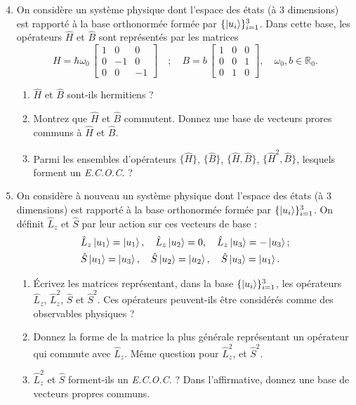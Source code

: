 \begin{enumerate}
\setcounter{enumi}{3}
\item On considère un système physique dont l'espace des états (à 3 dimensions) est rapporté à la base orthonormée formée par $\lbrace \ket{u_i} \rbrace_{i=1}^3$. Dans cette base, les opérateurs $\hat H$ et $\hat B$ sont représentés par les matrices
\begin{equation}
H =\hbar \omega_0 \,  \left[ 
\begin{array}{ccc}
1 & 0 & 0 \\ 
0 & -1 & 0 \\ 
0 & 0 & -1
\end{array} 
\right]
\quad ; \quad
B = b \, \left[
\begin{array}{ccc}
1 & 0 & 0 \\ 
0 & 0 & 1 \\ 
0 & 1 & 0
\end{array} 
\right], \quad \omega_0,b \in \mathbb{R}_0.
\end{equation}
	\begin{enumerate}
	\item $\hat H$ et $\hat B$ sont-ils hermitiens ?
	\item Montrez que $\hat H$ et $\hat B$ commutent. Donnez une base de vecteurs prores communs à $\hat H$ et $\hat B$. 
	\item Parmi les ensembles d'opérateurs $\lbrace \hat H \rbrace$, $\lbrace \hat B \rbrace$, $\lbrace \hat H,\hat B \rbrace$, $\lbrace \hat H^2,\hat B \rbrace$, lesquels forment un \textit{E.C.O.C.} ?
	\end{enumerate}

	\item On considère à nouveau un système physique dont l'espace des états (à 3 dimensions) est rapporté à la base orthonormée formée par $\lbrace \ket{u_i} \rbrace_{i=1}^3$. On définit $\hat L_z$ et $\hat S$ par leur action sur ces vecteurs de base :
	\begin{equation}
	\begin{split}
	&\hat L_z \ket{u_1} = \ket{u_1}, \quad \hat L_z \ket{u_2} = 0, \quad \hat L_z \ket{u_3} = -\ket{u_3}; \\
	&\hat S \ket{u_1} = \ket{u_3}, \quad \hat S \ket{u_2} = \ket{u_2}, \quad \hat S \ket{u_3} = \ket{u_1}.
	\end{split}
	\end{equation}
	\begin{enumerate}
	\item Écrivez les matrices représentant, dans la base $\lbrace \ket{u_i} \rbrace_{i=1}^3$, les opérateurs $\hat L_z$, $\hat L_z^2$, $\hat S$ et $\hat S^2$. Ces opérateurs peuvent-ils être considérés comme des observables physiques ?
	\item Donnez la forme de la matrice la plus générale représentant un opérateur qui commute avec $\hat L_z$. Même question pour $\hat L_z^2$, et $\hat S^2$. 
	\item $\hat L^2_z$ et $\hat S$ forment-ils un \textit{E.C.O.C.} ? Dans l'affirmative, donnez une base de vecteurs propres communs. 
	\end{enumerate}
	 
\end{enumerate}

